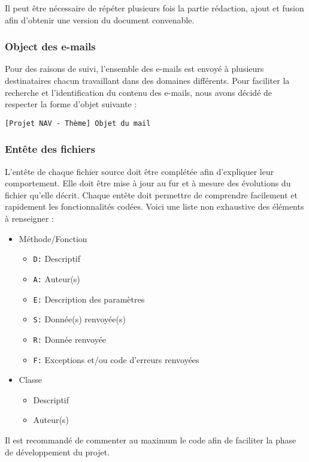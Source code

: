 \documentclass[10pt,a4paper]{article}
\begin{document}
Il peut être nécessaire de répéter plusieurs fois la partie rédaction, ajout et fusion afin d'obtenir une version du document convenable.

\subsubsection{Object des e-mails}

Pour des raisons de suivi, l'ensemble des e-mails est envoyé à plusieurs destinataires chacun travaillant dans des domaines différents. Pour faciliter la recherche et l'identification du contenu des e-mails, nous avons décidé de respecter la forme d'objet suivante : 

\verb|[Projet NAV - Thème] Objet du mail|

\subsubsection{Entête des fichiers}
L'entête de chaque fichier source doit être complétée afin d'expliquer leur comportement. Elle doit être mise à jour au fur et à mesure des évolutions du fichier qu'elle décrit.
Chaque entête doit permettre de comprendre facilement et rapidement les fonctionnalités codées.
Voici une liste non exhaustive des éléments à renseigner :
\begin{itemize}
\item Méthode/Fonction
\begin{itemize} 
	\renewcommand{\labelitemii}{$\cdot$}
	\item \verb|D:| Descriptif
	\item \verb|A:| Auteur(s)
	\item \verb|E:| Description des paramètres
	\item \verb|S:| Donnée(s) renvoyée(s)
	\item \verb|R:| Donnée renvoyée
	\item \verb|F:| Exceptions et/ou code d'erreurs renvoyées
\end{itemize}
\item Classe
\begin{itemize} 
	\renewcommand{\labelitemii}{$\cdot$} 
	\item Descriptif
	\item Auteur(s)
\end{itemize}
\end{itemize}

Il est recommandé de commenter au maximum le code afin de faciliter la phase de développement du projet.
\end{document}
